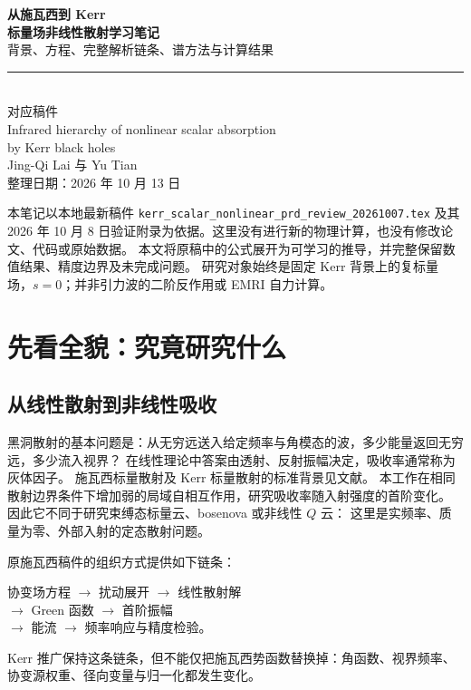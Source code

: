 \documentclass[UTF8,fontset=fandol,11pt,a4paper]{ctexart}
\numberwithin{equation}{section}
\begin{document}
\begin{titlepage}
\vspace*{16mm}
\begin{center}
{\Huge\bfseries 从施瓦西到 Kerr}\\[7mm]
{\LARGE\bfseries 标量场非线性散射学习笔记}\\[7mm]
{\large 背景、方程、完整解析链条、谱方法与计算结果}\\[15mm]
\rule{.86\textwidth}{.6pt}\\[7mm]
{\large 对应稿件}\\[3mm]
{\Large Infrared hierarchy of nonlinear scalar absorption\\by Kerr black holes}\\[5mm]
{\large Jing-Qi Lai 与 Yu Tian}\\[12mm]
整理日期：2026 年 10 月 13 日
\end{center}
\vfill
\begin{remarkbox}
本笔记以本地最新稿件 \texttt{kerr\_scalar\_nonlinear\_prd\_review\_20261007.tex}
及其 2026 年 10 月 8 日验证附录为依据。这里没有进行新的物理计算，也没有修改论文、代码或原始数据。
本文将原稿中的公式展开为可学习的推导，并完整保留数值结果、精度边界及未完成问题。
研究对象始终是固定 Kerr 背景上的复标量场，$s=0$；并非引力波的二阶反作用或 EMRI 自力计算。
\end{remarkbox}
\end{titlepage}
\tableofcontents\clearpage

\section{先看全貌：究竟研究什么}
\subsection{从线性散射到非线性吸收}
黑洞散射的基本问题是：从无穷远送入给定频率与角模态的波，多少能量返回无穷远，多少流入视界？
在线性理论中答案由透射、反射振幅决定，吸收率通常称为灰体因子。
施瓦西标量散射及 Kerr 标量散射的标准背景见文献\cite{Sanchez1976,Futterman,GlampedakisAndersson2001}。
本工作在相同散射边界条件下增加弱的局域自相互作用，研究吸收率随入射强度的首阶变化。
因此它不同于研究束缚态标量云、bosenova 或非线性 $Q$ 云\cite{YoshinoKodama2012,Baryakhtar2021,HerdeiroQCloud2014}：
这里是实频率、质量为零、外部入射的定态散射问题。

原施瓦西稿件的组织方式\cite{HeTianZhangManuscript2026}提供如下链条：
\begin{center}
协变场方程 $\longrightarrow$ 扰动展开 $\longrightarrow$ 线性散射解\\
$\longrightarrow$ Green 函数 $\longrightarrow$ 首阶振幅\\
$\longrightarrow$ 能流 $\longrightarrow$ 频率响应与精度检验。
\end{center}
Kerr 推广保持这条链条，但不能仅把施瓦西势函数替换掉：角函数、视界频率、协变源权重、径向变量与归一化都发生变化。
\end{document}

